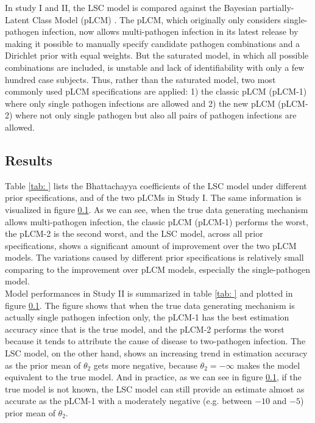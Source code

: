 \documentclass[11 pt, a4paper]{article}  %
\begin{document}
In study I and II, the LSC model is compared against the Bayesian partially-Latent Class Model (pLCM) \cite{wu2015partially}. The pLCM, which originally only considers single-pathogen infection, now allows multi-pathogen infection in its latest release by making it possible to manually specify candidate pathogen combinations and a Dirichlet prior with equal weights. But the saturated model, in which all possible combinations are included, is unstable and lack of identifiability with only a few hundred case subjects. Thus, rather than the saturated model, two most commonly used pLCM specifications are applied: 1) the classic pLCM (pLCM-1) where only single pathogen infections are allowed and 2) the new pLCM (pLCM-2) where not only single pathogen but also all pairs of pathogen infections are allowed.\\

\subsection{Results}
Table \ref{tab: } lists the Bhattachayya coefficients of the LSC model under different prior specifications, and of the two pLCMs in Study I. The same information is visualized in figure \ref{}. As we can see, when the true data generating mechanism allows multi-pathogen infection, the classic pLCM (pLCM-1) performs the worst, the pLCM-2 is the second worst, and the LSC model, across all prior specifications, shows a significant amount of improvement over the two pLCM models. The variations caused by different prior specifications is relatively small comparing to the improvement over pLCM models, especially the single-pathogen model.\\

Model performances in Study II is summarized in table \ref{tab: } and plotted in figure \ref{}. The figure shows that when the true data generating mechanism is actually single pathogen infection only, the pLCM-1 has the best estimation accuracy since that is the true model, and the pLCM-2 performs the worst because it tends to attribute the cause of disease to two-pathogen infection. The LSC model, on the other hand, shows an increasing trend in estimation accuracy as the prior mean of $\theta_2$ gets more negative, because $\theta_2 = -\infty$ makes the model equivalent to the true model. And in practice, as we can see in figure \ref{}, if the true model is not known, the LSC model can still provide an estimate almost as accurate as the pLCM-1 with a moderately negative (e.g. between $-10$ and $-5$) prior mean of $\theta_2$.\\
\end{document}
